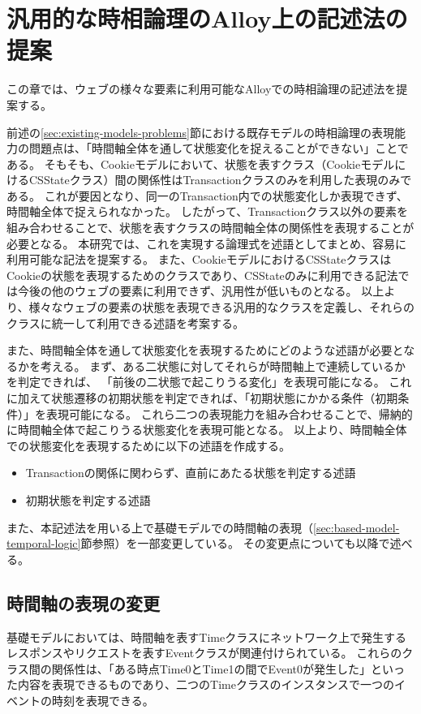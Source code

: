 \documentclass[12pt,a4paper]{jbook}
\begin{document}
\newpage

\chapter{汎用的な時相論理のAlloy上の記述法の提案}
\label{sec:ProposedModel-TemporalLogic}
この章では、ウェブの様々な要素に利用可能なAlloyでの時相論理の記述法を提案する。

前述の\ref{sec:existing-models-problems}節における既存モデルの時相論理の表現能力の問題点は、「時間軸全体を通して状態変化を捉えることができない」ことである。
そもそも、Cookieモデルにおいて、状態を表すクラス（CookieモデルにけるCSStateクラス）間の関係性はTransactionクラスのみを利用した表現のみである。
これが要因となり、同一のTransaction内での状態変化しか表現できず、時間軸全体で捉えられなかった。
したがって、Transactionクラス以外の要素を組み合わせることで、状態を表すクラスの時間軸全体の関係性を表現することが必要となる。
本研究では、これを実現する論理式を述語としてまとめ、容易に利用可能な記法を提案する。
また、CookieモデルにおけるCSStateクラスはCookieの状態を表現するためのクラスであり、CSStateのみに利用できる記法では今後の他のウェブの要素に利用できず、汎用性が低いものとなる。
以上より、様々なウェブの要素の状態を表現できる汎用的なクラスを定義し、それらのクラスに統一して利用できる述語を考案する。

また、時間軸全体を通して状態変化を表現するためにどのような述語が必要となるかを考える。
まず、ある二状態に対してそれらが時間軸上で連続しているかを判定できれば、
「前後の二状態で起こりうる変化」を表現可能になる。
これに加えて状態遷移の初期状態を判定できれば、「初期状態にかかる条件（初期条件）」を表現可能になる。
これら二つの表現能力を組み合わせることで、帰納的に時間軸全体で起こりうる状態変化を表現可能となる。
以上より、時間軸全体での状態変化を表現するために以下の述語を作成する。
\begin{itemize}
\item Transactionの関係に関わらず、直前にあたる状態を判定する述語
\item 初期状態を判定する述語
\end{itemize}

また、本記述法を用いる上で基礎モデルでの時間軸の表現（\ref{sec:based-model-temporal-logic}節参照）を一部変更している。
その変更点についても以降で述べる。

\section{時間軸の表現の変更}
基礎モデル\cite{based-model}においては、時間軸を表すTimeクラスにネットワーク上で発生するレスポンスやリクエストを表すEventクラスが関連付けられている。
これらのクラス間の関係性は、「ある時点Time0とTime1の間でEvent0が発生した」といった内容を表現できるものであり、二つのTimeクラスのインスタンスで一つのイベントの時刻を表現できる。
\end{document}
